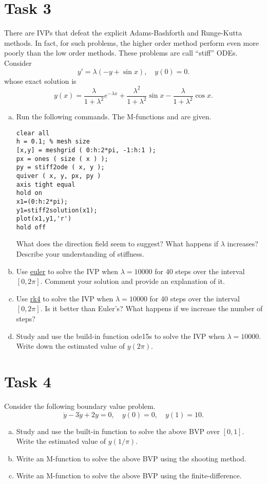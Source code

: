 \section*{Task 3}
There are IVPs that defeat the explicit Adams-Bashforth and Runge-Kutta methods.
In fact, for such problems, the higher order method perform even more poorly than the low
order methods.
These problems are call ``stiff'' ODEs.
Consider
\[ y' = \lambda(-y+\sin x),\quad y(0) = 0. \]
whose exact solution is
\[ y(x)=\frac{\lambda}{1+\lambda^2}e^{-\lambda x}+\frac{\lambda^2}{1+\lambda^2}\sin x-\frac{\lambda}{1+\lambda^2}\cos x. \]
\begin{enumerate}[(a)]
	\item Run the following commands.
	The M-functions {\color{blue}{stiff2ode}} and {\color{blue}{stiff2solution}} are given.
	\begin{lstlisting}[style=Matlab-editor]
clear all
h = 0.1; % mesh size
[x,y] = meshgrid ( 0:h:2*pi, -1:h:1 );
px = ones ( size ( x ) );
py = stiff2ode ( x, y );
quiver ( x, y, px, py )
axis tight equal
hold on
x1=(0:h:2*pi);
y1=stiff2solution(x1);
plot(x1,y1,'r')
hold off
	\end{lstlisting}
	What does the direction field seem to suggest?
	What happens if \(\lambda\) increases?
	Describe your understanding of stiffness.
	\item Use \hyperref[euler]{euler} to solve the IVP when \(\lambda = 10000\) for 40 steps over the interval \([0, 2\pi]\).
	Comment your solution and provide an explanation of it.
	\item Use \hyperref[rk4]{rk4} to solve the IVP when \(\lambda = 10000\) for 40 steps over the interval \([0, 2\pi]\).
	Is it better than Euler's?
	What happens if we increase the number of steps?
	\item Study and use the build-in function ode15s to solve the IVP when \(\lambda = 10000\).
	Write down the estimated value of \(y(2\pi)\).
\end{enumerate}


\section*{Task 4}
Consider the following boundary value problem.
\[ \ddot{y}-3\dot{y}+2y=0, \quad y(0)=0, \quad y(1)=10. \]
\begin{enumerate}[(a)]
	\item Study and use the built-in function {\color{blue}{bvp4c}} to solve the above BVP over \([0, 1]\).
	Write the estimated value of \(y(1/\pi)\).
	\item Write an M-function to solve the above BVP using the shooting method.
	\item Write an M-function to solve the above BVP using the finite-difference.
\end{enumerate}
